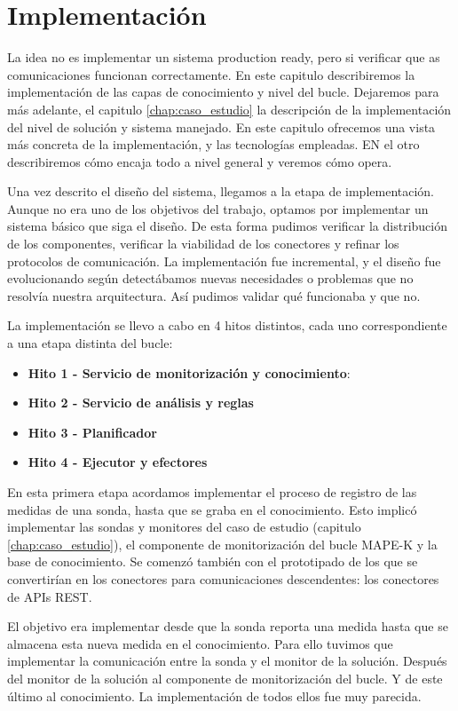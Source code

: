 
\chapter{Implementación}
\label{chap:implementación}

La idea no es implementar un sistema production ready, pero si verificar que as comunicaciones funcionan correctamente. En este capitulo describiremos la implementación de las capas de conocimiento y nivel del bucle. Dejaremos para más adelante, el capitulo \ref{chap:caso_estudio} la descripción de la implementación del nivel de solución y sistema manejado. En este capitulo ofrecemos una vista más concreta de la implementación, y las tecnologías empleadas. EN el otro describiremos cómo encaja todo a nivel general y veremos cómo opera.

Una vez descrito el diseño del sistema, llegamos a la etapa de implementación. Aunque no era uno de los objetivos del trabajo, optamos por implementar un sistema básico que siga el diseño. De esta forma pudimos verificar la distribución de los componentes, verificar la viabilidad de los conectores y refinar los protocolos de comunicación. La implementación fue incremental, y el diseño fue evolucionando según detectábamos nuevas necesidades o problemas que no resolvía nuestra arquitectura. Así pudimos validar qué funcionaba y que no.

La implementación se llevo a cabo en 4 hitos distintos, cada uno correspondiente a una etapa distinta del bucle:
\begin{itemize}
  \item \textbf{Hito 1 - Servicio de monitorización y conocimiento}:
  \item \textbf{Hito 2 - Servicio de análisis y reglas}
  \item \textbf{Hito 3 - Planificador}
  \item \textbf{Hito 4 - Ejecutor y efectores}
\end{itemize}

En esta primera etapa acordamos implementar el proceso de registro de las medidas de una sonda, hasta que se graba en el conocimiento. Esto implicó implementar las sondas y monitores del caso de estudio (capitulo \ref{chap:caso_estudio}), el componente de monitorización del bucle MAPE-K y la base de conocimiento. Se comenzó también con el prototipado de los que se convertirían en los conectores para comunicaciones descendentes: los conectores de APIs REST.

El objetivo era implementar desde que la sonda reporta una medida hasta que se almacena esta nueva medida en el conocimiento. Para ello tuvimos que implementar la comunicación entre la sonda y el monitor de la solución. Después del monitor de la solución al componente de monitorización del bucle. Y de este último al conocimiento. La implementación de todos ellos fue muy parecida.

